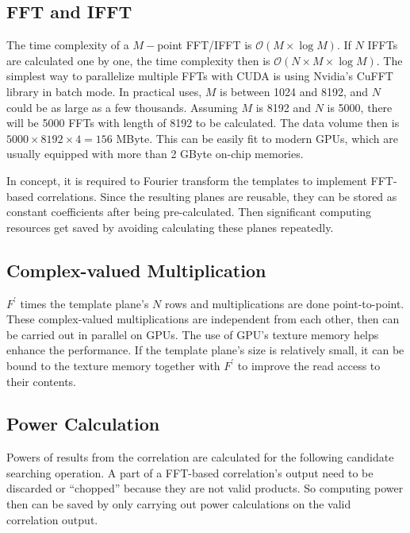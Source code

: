\documentclass[preprint2]{aastex}
\begin{document}


\subsection{FFT and IFFT}

The time complexity of a $M-$point FFT/IFFT is 
$\mathcal{O}(M\times{\log{M}})$. If $N$ IFFTs are calculated one by one, 
the time complexity then is $\mathcal{O}(N\times{M}\times{\log{M}})$. 
The simplest way to parallelize multiple FFTs with CUDA is using Nvidia's CuFFT library in batch mode. 
In practical uses, $M$ is between 1024 and 8192, and $N$ could be as large as a few thousands. 
Assuming $M$ is 8192 and $N$ is 5000, there will be 5000 FFTs with length of 8192 to be 
calculated. The data volume then is $5000{\times}8192{\times}4=156$ MByte. This can be easily 
fit to modern GPUs, which are usually equipped with more than 2 GByte on-chip memories.

In concept, it is required to Fourier transform the templates to implement FFT-based correlations. Since the 
resulting planes are reusable, they can be stored as constant coefficients after being pre-calculated. Then significant
 computing resources get saved by avoiding calculating these planes repeatedly. 
 
\subsection{Complex-valued Multiplication}
$F^{'}$ times the template plane's $N$ rows and multiplications are done point-to-point.
These complex-valued multiplications are independent from each other, then can be carried out in  
parallel on GPUs. The use of GPU's texture memory helps enhance the performance. If the template 
plane's size is relatively small, it can be bound to the texture memory together with $F^{'}$ to  
improve the read access to their contents.

\subsection{Power Calculation}
Powers of results from the correlation are calculated for the following candidate searching operation. A part  
of a FFT-based correlation's output need to be discarded or ``chopped'' because they are not valid products.
So computing power then can be saved by only carrying out power calculations on the valid correlation output. 
 
\end{document}
